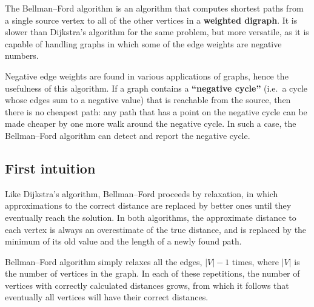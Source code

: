 \documentclass[11pt]{article}
\begin{document}
The Bellman--Ford algorithm \cite{bellman-ford} is an algorithm that computes shortest paths
from a single source vertex to all of the other vertices in a
\textbf{weighted digraph}. It is slower than Dijkstra's algorithm for
the same problem, but more versatile, as it is capable of handling
graphs in which some of the edge weights are negative numbers.

    Negative edge weights are found in various applications of graphs, hence
the usefulness of this algorithm. If a graph contains a
\textbf{``negative cycle''} (i.e.~a cycle whose edges sum to a negative
value) that is reachable from the source, then there is no cheapest
path: any path that has a point on the negative cycle can be made
cheaper by one more walk around the negative cycle. In such a case, the
Bellman--Ford algorithm can detect and report the negative cycle.

    \hypertarget{first-intuition}{%
\subsection{First intuition}\label{first-intuition}}

Like Dijkstra's algorithm, Bellman--Ford proceeds by relaxation, in
which approximations to the correct distance are replaced by better ones
until they eventually reach the solution. In both algorithms, the
approximate distance to each vertex is always an overestimate of the
true distance, and is replaced by the minimum of its old value and the
length of a newly found path.

Bellman--Ford algorithm simply relaxes all the edges, \(|V|-1\) times,
where \(|V|\) is the number of vertices in the graph. In each of these
repetitions, the number of vertices with correctly calculated distances
grows, from which it follows that eventually all vertices will have
their correct distances.
\end{document}
